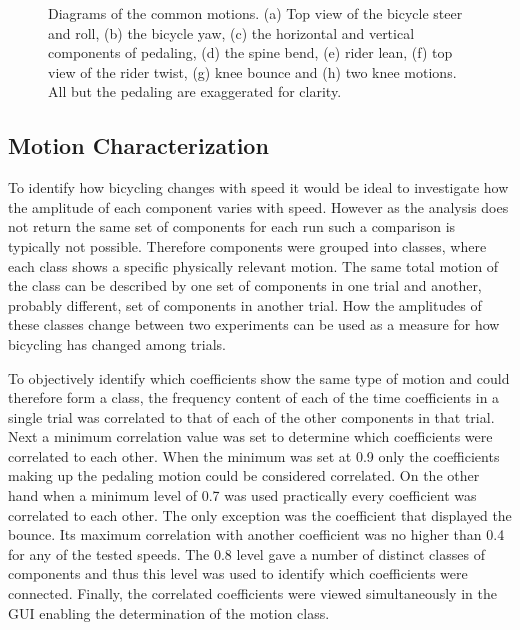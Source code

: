 \begin{figure}[]
    \begin{center}
        \qquad
        \qquad
        \qquad

        \qquad
        \qquad
        \qquad
    \end{center}
    \caption{Diagrams of the common motions. (a) Top view of the bicycle steer
    and roll, (b) the bicycle yaw, (c) the horizontal and vertical components
    of pedaling, (d) the spine bend, (e) rider lean, (f) top view of the rider
    twist, (g) knee bounce and (h) two knee motions. All but the pedaling are
    exaggerated for clarity.}
    \label{fig:motions}
\end{figure}

\subsection{Motion Characterization}
\label{sec:motionChar}
To identify how bicycling changes with speed it would be ideal to investigate
how the amplitude of each component varies with speed. However as the analysis
does not return the same set of components for each run such a comparison is
typically not possible. Therefore components were grouped into classes, where
each class shows a specific physically relevant motion. The same total motion
of the class can be described by one set of components in one trial and
another, probably different, set of components in another trial. How the
amplitudes of these classes change between two experiments can be used as a
measure for how bicycling has changed among trials.

To objectively identify which coefficients show the same type of motion and
could therefore form a class, the frequency content of each of the time
coefficients in a single trial was correlated to that of each of the other
components in that trial. Next a minimum correlation value was set to determine
which coefficients were correlated to each other. When the minimum was set at
0.9 only the coefficients making up the pedaling motion could be considered
correlated. On the other hand when a minimum level of 0.7 was used practically
every coefficient was correlated to each other. The only exception was the
coefficient that displayed the bounce. Its maximum correlation with another
coefficient was no higher than 0.4 for any of the tested speeds. The 0.8 level
gave a number of distinct classes of components and thus this level was used to
identify which coefficients were connected. Finally, the correlated
coefficients were viewed simultaneously in the GUI enabling the determination
of the motion class.

